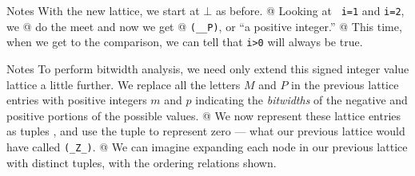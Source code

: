 \documentclass[%
pdf,
colorBG,
slideColor,
nototal,
oqe
]{prosper}
\newenvironment{talknotes}{\begin{slide}{Notes}\tiny}{\end{slide}}
\begin{document}
\begin{talknotes}
With the new lattice, we start at $\bot$ as before. @ Looking at {\tt
  i=1} and {\tt i=2}, we @ do the meet and now we get @
{\tt (\_\_P)}, or ``a positive
  integer.'' @ This time, when we get to the comparison, we can tell
that {\tt i>0} will always be true.
\end{talknotes}


\begin{talknotes}
To perform bitwidth analysis, we need only extend this signed integer
value lattice a little further.  We replace all the letters $M$ and
$P$ in the previous lattice entries with positive integers $m$ and $p$
indicating the \emph{bitwidths} of the negative and positive portions
of the possible values.  @ We now represent these lattice entries as
tuples , and use the  tuple to represent zero ---
what our previous lattice would have called {\tt (\_Z\_)}.  @ We can
imagine expanding each node in our previous lattice with distinct
tuples, with the ordering relations shown.
\end{talknotes}
\end{document}
